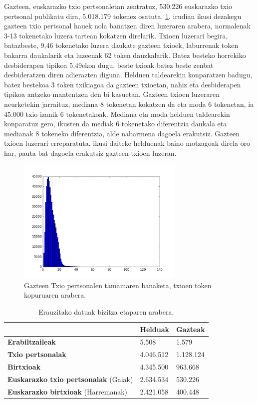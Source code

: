 \documentclass[information,article,submit,moreauthors,pdftex,10pt,a4paper]{Definitions/mdpi}
\begin{document}
\indent Gazteen, euskarazko txio pertsonaletan zentratuz, 530.226 euskarazko txio pertsonal publikatu dira, 5.018.179 tokenez osatuta. \ref{fig:txio luze gzt}. irudian ikusi dezakegu gazteen txio pertsonal hauek nola banatzen diren luzeraren arabera, normalenak 3-13 tokenetako luzera tartean kokatzen direlarik. Txioen luzerari begira, batazbeste, 9,46 tokenetako luzera daukate gazteen txioek, laburrenak token bakarra daukalarik eta luzeenak 62 token dauzkalarik. Batez besteko horrekiko desbiderapen tipikoa 5,49ekoa dugu, beste txioak batez beste zenbat desbideratzen diren adierazten diguna. Helduen taldearekin konparatzen badugu, batez bestekoa 3 token txikiagoa da gazteen txioetan, nahiz eta desbiderapen tipikoa antzeko mantentzen den bi kasuetan. Gazteen txioen luzeraren neurketekin jarraituz, mediana 8 tokenetan kokatzen da eta moda 6 tokenetan, ia 45.000 txio izanik 6 tokenetakoak. Mediana eta moda helduen taldearekin konparatuz gero, ikusten da mediak 6 tokenetako diferentzia daukala eta medianak 8 tokeneko diferentzia, alde nabarmena dagoela erakutsiz. Gazteen txioen luzerari erreparatuta, ikusi daiteke helduenak baino motzagoak direla oro har, pauta bat dagoela erakutsiz gazteen txioen luzeran.

\begin{figure}[H]
  \centering
  \includegraphics[height=6cm]{graf_inf}
  \caption{Gazteen Txio pertsonalen tamainaren banaketa, txioen token kopuruaren arabera.}
  \label{fig:txio luze gzt}
\end{figure}

\begin{table}[H]
  \centering
  \begin{tabular}{|l|l|l|}
    \hline
     & \textbf{Helduak} & \textbf{Gazteak}\\ \hline
    \textbf{Erabiltzaileak}  & 5.508 & 1.579\\ \hline
    \textbf{Txio pertsonalak} & 4.046.512 & 1.128.124\\ \hline
    \textbf{Birtxioak}  & 4.345.500 & 963.668\\ \hline
    \textbf{Euskarazko txio pertsonalak} (Gaiak) & 2.634.534 & 530.226\\ \hline
    \textbf{Euskarazko birtxioak} (Harremanak) & 2.421.058 & 400.448\\ \hline
  \end{tabular}
  \caption{Erauzitako datuak bizitza etaparen arabera.}
  \label{tab:datuen nolakotasuna 2}
\end{table}
\end{document}
